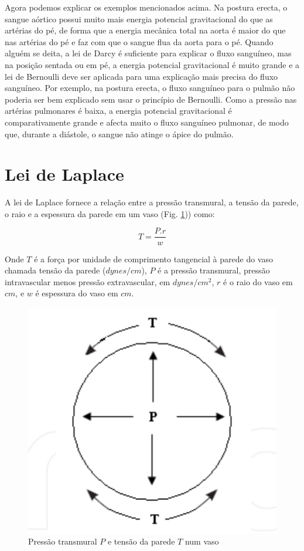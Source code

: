 \documentclass[
  portuguese,
  ]{book}
\begin{document}
Agora podemos explicar os exemplos mencionados acima. Na postura erecta, o sangue aórtico possui muito mais energia potencial gravitacional do que as artérias do pé, de forma que a energia mecânica total na aorta é maior do que nas artérias do pé e faz com que o sangue flua da aorta para o pé.
Quando alguém se deita, a lei de Darcy é suficiente para explicar o fluxo sanguíneo, mas na posição sentada ou em pé, a energia potencial gravitacional é muito grande e a lei de Bernoulli deve ser aplicada para uma explicação mais precisa do fluxo sanguíneo. Por exemplo, na postura erecta, o fluxo sanguíneo para o pulmão não poderia ser bem explicado sem usar o princípio de Bernoulli. Como a pressão nas artérias pulmonares é baixa, a energia potencial gravitacional é comparativamente grande e afecta muito o fluxo sanguíneo pulmonar, de modo que, durante a diástole, o sangue não atinge o ápice do pulmão.

\hypertarget{lei-de-laplace}{%
\section{Lei de Laplace}\label{lei-de-laplace}}

A lei de Laplace fornece a relação entre a pressão transmural, a tensão da parede, o raio e a espessura da parede em um vaso (Fig. \ref{fig:imghemo5})) como:

\begin{equation}
T=\frac{P.r}{w}
\label{eq:laplace}
\end{equation}

Onde \(T\) é a força por unidade de comprimento tangencial à parede do vaso chamada tensão da parede (\(dynes/cm\)), \(P\) é a pressão transmural, pressão intravascular menos pressão extravascular, em \(dynes/cm^2\), \(r\) é o raio do vaso em \(cm\), e \(w\) é espessura do vaso em \(cm\).

\begin{figure}

{\centering \includegraphics{img/hemo_5} 

}

\caption{Pressão transmural $P$ e tensão da parede $T$ num vaso}\label{fig:imghemo5}
\end{figure}
\end{document}
